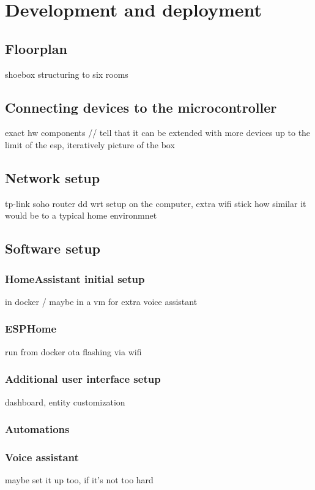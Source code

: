 \chapter{Development and deployment} %

\section{Floorplan}
shoebox structuring to six rooms
\section{Connecting devices to the microcontroller}
exact hw components
// tell that it can be extended with more devices up to the limit of the esp, iteratively
picture of the box
\section{Network setup}
tp-link soho router
dd wrt
setup on the computer, extra wifi stick
how similar it would be to a typical home environmnet
\section{Software setup}
\subsection{HomeAssistant initial setup}
in docker / maybe in a vm for extra voice assistant
\subsection{ESPHome}
run from docker
ota flashing via wifi
\subsection{Additional user interface setup}
dashboard, entity customization
\subsection{Automations}
\subsection{Voice assistant}
maybe set it up too, if it's not too hard
